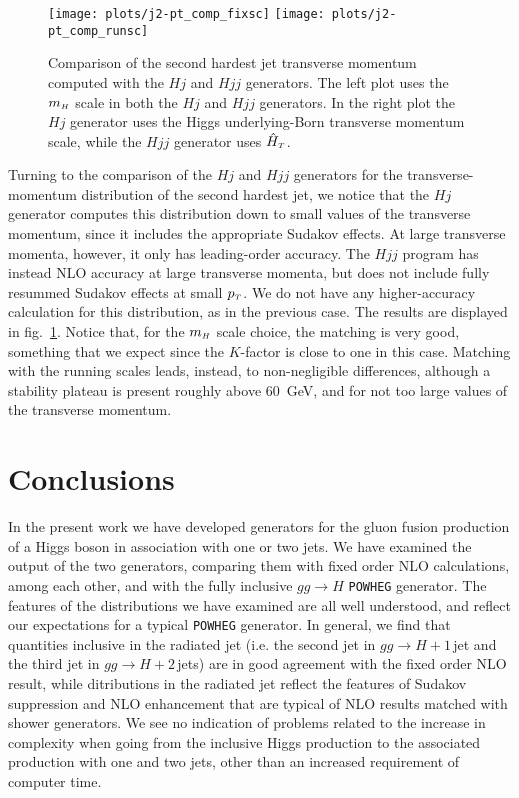 \documentclass[paper]{JHEP3}
\newlength{\hfig}
\newlength{\hfigs}
\newcommand\mH{m_{\sss  H}}
\newcommand\HThat{\hat{H}_{\sss  T}}
\newcommand\sss{\mathchoice%
{\displaystyle}%
{\scriptstyle}%
{\scriptscriptstyle}%
{\scriptscriptstyle}%
}
\newcommand\pT{p_{\sss T}}
\newcommand\POWHEG{{\tt POWHEG}}
\begin{document}
\begin{figure}[htb]
\begin{center}
\texttt{[image: plots/j2-pt\_comp\_fixsc]} \nolinebreak
\texttt{[image: plots/j2-pt\_comp\_runsc]} 
\caption{Comparison of the second hardest jet transverse momentum computed
  with the $Hj$ and $Hjj$ generators. The left plot uses the $\mH$ scale in
  both the $Hj$ and $Hjj$ generators. In the right plot the $Hj$ generator
  uses the Higgs underlying-Born transverse momentum scale, while the $Hjj$
  generator uses $\HThat$.}
\label{fig:j2-pt_comp}
\end{center}
\end{figure}
Turning to the comparison of the $Hj$ and $Hjj$ generators for the
transverse-momentum distribution of the second hardest jet, we notice that
the $Hj$ generator computes this distribution down to small values of the
transverse momentum, since it includes the appropriate Sudakov effects.  At
large transverse momenta, however, it only has leading-order accuracy.  The
$Hjj$ program has instead NLO accuracy at large transverse momenta, but does
not include fully resummed Sudakov effects at small $\pT$.  We do not have
any higher-accuracy calculation for this distribution, as in the previous
case. The results are displayed in fig.~\ref{fig:j2-pt_comp}.  Notice that,
for the $\mH$ scale choice, the matching is very good, something that we
expect since the $K$-factor is close to one in this case. Matching with the
running scales leads, instead, to non-negligible differences, although a
stability plateau is present roughly above $60$~GeV, and for not too large
values of the transverse momentum.

\section{Conclusions}
\label{sec:conc}
In the present work we have developed generators for the gluon fusion
production of a Higgs boson in association with one or two jets. We have
examined the output of the two generators, comparing them with fixed
order NLO calculations, among each other, and with the fully inclusive
$gg\to H$ \POWHEG{} generator.
The features of the distributions we have examined
are all well understood, and reflect our expectations for a typical \POWHEG{}
generator. In general, we find that quantities inclusive in the radiated
jet (i.e. the second jet in $gg\to H+1\,$jet and the third jet in
 $gg\to H+2\,$jets) are in good agreement with the fixed order NLO result,
while ditributions in the radiated jet reflect the features of Sudakov
suppression and NLO enhancement that are typical of NLO results matched with
shower generators. We see no indication of problems related to the increase
in complexity when going from the inclusive Higgs production to the
associated production with one and two jets, other than an increased
requirement of computer time.
\end{document}
